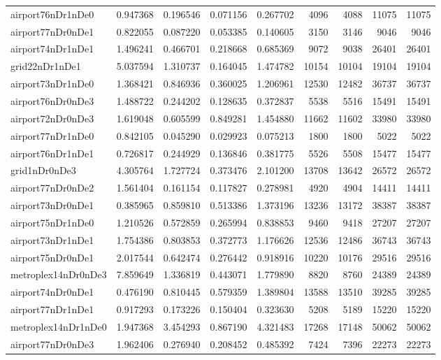 \begin{longtable}{|l|r|r|r|r|r|r|r|r|}
airport76nDr1nDe0 & 0.947368 & 0.196546 & 0.071156 & 0.267702 & 4096 & 4088 & 11075 & 11075 \\
airport77nDr0nDe1 & 0.822055 & 0.087220 & 0.053385 & 0.140605 & 3150 & 3146 & 9046 & 9046 \\
airport74nDr1nDe1 & 1.496241 & 0.466701 & 0.218668 & 0.685369 & 9072 & 9038 & 26401 & 26401 \\
grid22nDr1nDe1 & 5.037594 & 1.310737 & 0.164045 & 1.474782 & 10154 & 10104 & 19104 & 19104 \\
airport73nDr1nDe0 & 1.368421 & 0.846936 & 0.360025 & 1.206961 & 12530 & 12482 & 36737 & 36737 \\
airport76nDr0nDe3 & 1.488722 & 0.244202 & 0.128635 & 0.372837 & 5538 & 5516 & 15491 & 15491 \\
airport72nDr0nDe3 & 1.619048 & 0.605599 & 0.849281 & 1.454880 & 11662 & 11602 & 33980 & 33980 \\
airport77nDr1nDe0 & 0.842105 & 0.045290 & 0.029923 & 0.075213 & 1800 & 1800 & 5022 & 5022 \\
airport76nDr1nDe1 & 0.726817 & 0.244929 & 0.136846 & 0.381775 & 5526 & 5508 & 15477 & 15477 \\
grid1nDr0nDe3 & 4.305764 & 1.727724 & 0.373476 & 2.101200 & 13708 & 13642 & 26572 & 26572 \\
airport77nDr0nDe2 & 1.561404 & 0.161154 & 0.117827 & 0.278981 & 4920 & 4904 & 14411 & 14411 \\
airport73nDr0nDe1 & 0.385965 & 0.859810 & 0.513386 & 1.373196 & 13236 & 13172 & 38387 & 38387 \\
airport75nDr1nDe0 & 1.210526 & 0.572859 & 0.265994 & 0.838853 & 9460 & 9418 & 27207 & 27207 \\
airport73nDr1nDe1 & 1.754386 & 0.803853 & 0.372773 & 1.176626 & 12536 & 12486 & 36743 & 36743 \\
airport75nDr0nDe1 & 2.017544 & 0.642474 & 0.276442 & 0.918916 & 10220 & 10176 & 29516 & 29516 \\
metroplex14nDr0nDe3 & 7.859649 & 1.336819 & 0.443071 & 1.779890 & 8820 & 8760 & 24389 & 24389 \\
airport74nDr0nDe1 & 0.476190 & 0.810445 & 0.579359 & 1.389804 & 13588 & 13510 & 39285 & 39285 \\
airport77nDr1nDe1 & 0.917293 & 0.173226 & 0.150404 & 0.323630 & 5208 & 5189 & 15220 & 15220 \\
metroplex14nDr1nDe0 & 1.947368 & 3.454293 & 0.867190 & 4.321483 & 17268 & 17148 & 50062 & 50062 \\
airport77nDr0nDe3 & 1.962406 & 0.276940 & 0.208452 & 0.485392 & 7424 & 7396 & 22273 & 22273 \\

\end{longtable}

